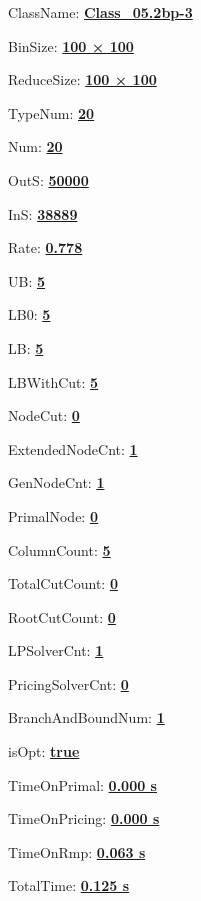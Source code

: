 \documentclass[11pt]{article}
\begin{document}
\pagestyle{empty}


ClassName: \underline{\textbf{Class_05.2bp-3}}
\par
BinSize: \underline{\textbf{100 × 100}}
\par
ReduceSize: \underline{\textbf{100 × 100}}
\par
TypeNum: \underline{\textbf{20}}
\par
Num: \underline{\textbf{20}}
\par
OutS: \underline{\textbf{50000}}
\par
InS: \underline{\textbf{38889}}
\par
Rate: \underline{\textbf{0.778}}
\par
UB: \underline{\textbf{5}}
\par
LB0: \underline{\textbf{5}}
\par
LB: \underline{\textbf{5}}
\par
LBWithCut: \underline{\textbf{5}}
\par
NodeCut: \underline{\textbf{0}}
\par
ExtendedNodeCnt: \underline{\textbf{1}}
\par
GenNodeCnt: \underline{\textbf{1}}
\par
PrimalNode: \underline{\textbf{0}}
\par
ColumnCount: \underline{\textbf{5}}
\par
TotalCutCount: \underline{\textbf{0}}
\par
RootCutCount: \underline{\textbf{0}}
\par
LPSolverCnt: \underline{\textbf{1}}
\par
PricingSolverCnt: \underline{\textbf{0}}
\par
BranchAndBoundNum: \underline{\textbf{1}}
\par
isOpt: \underline{\textbf{true}}
\par
TimeOnPrimal: \underline{\textbf{0.000 s}}
\par
TimeOnPricing: \underline{\textbf{0.000 s}}
\par
TimeOnRmp: \underline{\textbf{0.063 s}}
\par
TotalTime: \underline{\textbf{0.125 s}}
\par
\newpage


\end{document}
